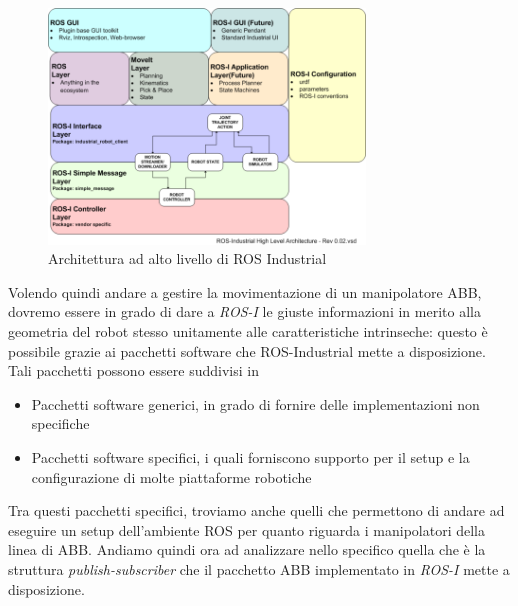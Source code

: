 \begin{figure}[h]
	\centering
	\includegraphics[width=0.75\textwidth]{Immagini/ROS_I_Structure}
	\caption{Architettura ad alto livello di ROS Industrial}
	\label{fig:RosIStructure}
\end{figure}

Volendo quindi andare a gestire la movimentazione di un manipolatore ABB, dovremo essere in grado di dare a \emph{ROS-I} le giuste informazioni in merito alla geometria del robot stesso unitamente alle caratteristiche intrinseche: questo è possibile grazie ai pacchetti software che ROS-Industrial mette a disposizione.
Tali pacchetti possono essere suddivisi in 
\begin{itemize}
	\item Pacchetti software generici, in grado di fornire delle implementazioni non specifiche
	\item Pacchetti software specifici, i quali forniscono supporto per il setup e la configurazione di molte piattaforme robotiche
\end{itemize}
Tra questi pacchetti specifici, troviamo anche quelli che permettono di andare ad eseguire un setup dell'ambiente ROS per quanto riguarda i manipolatori della linea di ABB.
Andiamo quindi ora ad analizzare nello specifico quella che è la struttura \emph{publish-subscriber} che il pacchetto ABB implementato in \emph{ROS-I} mette a disposizione.


